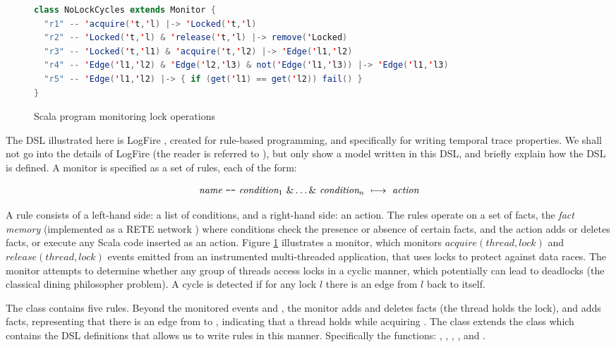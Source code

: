 \begin{figure}
\begin{lstlisting}[language=scala,frame=single]
class NoLockCycles extends Monitor {
  "r1" -- 'acquire('t,'l) |-> 'Locked('t,'l)
  "r2" -- 'Locked('t,'l) & 'release('t,'l) |-> remove('Locked)
  "r3" -- 'Locked('t,'l1) & 'acquire('t,'l2) |-> 'Edge('l1,'l2)
  "r4" -- 'Edge('l1,'l2) & 'Edge('l2,'l3) & not('Edge('l1,'l3)) |-> 'Edge('l1,'l3)
  "r5" -- 'Edge('l1,'l2) |-> { if (get('l1) == get('l2)) fail() }
}
\end{lstlisting}
\caption{Scala program monitoring lock operations}
\label{fig:deadlocks-scala}
\end{figure}

The DSL illustrated here is LogFire \cite{havelund-logfire-sttt14},
created for rule-based programming, and specifically for 
writing temporal trace properties. We shall not go into the details of LogFire (the reader is referred to \cite{havelund-logfire-sttt14}), but only show a model written in this DSL, 
and briefly explain how the DSL is defined. 
A monitor is specified as a set of rules, each of the form: 

\[
  \textit{name}\ \verb+--+\ \textit{condition}_1\ \& \ldots \&\ \textit{condition}_n\ \longmapsto\  \textit{action}
\]

\noindent
A rule consists of a left-hand side: a list of conditions, and a 
right-hand side:
an action. The rules operate on a set of facts, the 
{\em fact memory} (implemented as a RETE network \cite{?}) 
where conditions check the presence or absence of certain facts, 
and the action adds or deletes 
facts, or execute any Scala code inserted as an action. Figure 
\ref{fig:deadlocks-scala} illustrates 
a monitor, which monitors $acquire(thread,lock)$ and 
$release(thread,lock)$ events emitted from an instrumented 
multi-threaded application, that uses locks to protect against
data races. The monitor attempts to determine whether any 
group of threads access locks
in a cyclic manner, which potentially can lead to deadlocks (the classical dining philosopher problem). 
A cycle is detected if for any lock $l$ there is 
an edge from $l$ back to itself.

The class contains five rules. Beyond the monitored events
 and , the monitor adds 
and deletes  facts (the thread holds
the lock), and adds  facts, representing
that there is an edge from  to , indicating that a thread holds   while acquiring
. The class extends the  class which contains the DSL definitions that allows us to write rules in this manner. Specifically the functions: \iscala{--}, \iscala{&}, \iscala{|->}, , and . 

